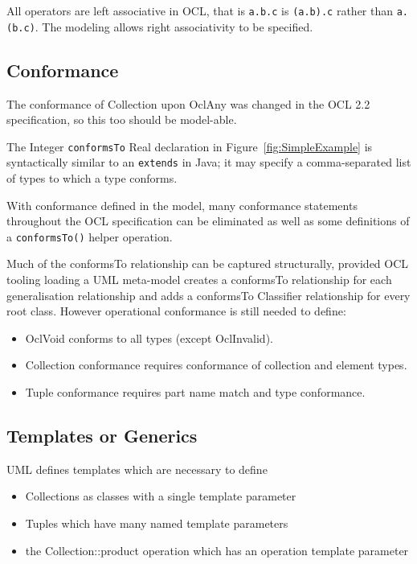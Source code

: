 \documentclass{eceasst}
\begin{document}
All operators are left associative in OCL, that is \verb|a.b.c| is \verb|(a.b).c| rather than \verb|a.(b.c)|. The modeling allows right associativity to be specified.

\subsection{Conformance}

The conformance of Collection upon OclAny was changed in the OCL 2.2 specification, so this too should be model-able.

The Integer \verb|conformsTo| Real declaration in Figure~\ref{fig:SimpleExample} is syntactically similar to an \verb|extends| in Java; it may specify a comma-separated list of types to which a type conforms.

With conformance defined in the model, many conformance statements throughout the OCL specification can be eliminated as well as some definitions of a \verb|conformsTo()| helper operation.

Much of the conformsTo relationship can be captured structurally, provided OCL tooling loading a UML meta-model creates a conformsTo relationship for each generalisation relationship and adds a conformsTo Classifier relationship for every root class. However operational conformance is still needed to define:

\begin{itemize}
\item OclVoid conforms to all types (except OclInvalid).
\item Collection conformance requires conformance of collection and element types.
\item Tuple conformance requires part name match and type conformance.
\end{itemize}

\subsection{Templates or Generics}

UML defines templates which are necessary to define
\begin{itemize}
\item Collections as classes with a single template parameter
\item Tuples which have many named template parameters
\item the Collection::product operation which has an operation template parameter
\end{itemize}
\end{document}
